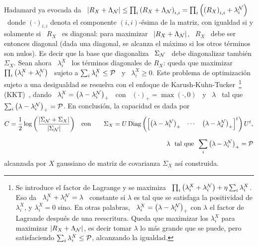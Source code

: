 Hadamard ya evocada da \ $\left| R_X + \Lambda_\N \right| \le \prod_i \left( R_X
  +  \Lambda_\N  \right)_{i,i}  =  \prod_i  \left( \left(  R_X  \right)_{i,i}  +
  \lambda^\N_i   \right)$   \  donde   $(\cdot)_{i,i}$   denota  el   componente
$(i,i)$-\'esima  de la  matriz, con  igualdad si  y solamente  si \  $R_X$  \ es
diagonal: para maximizar \ $\left| R_X + \Lambda_\N \right|$, \ $R_X$ \ debe ser
entonces  diagonal (dada  una  diagonal, se  alcanza  el m\'aximo  si los  otros
t\'erminos son  nulos).  Es decir  que la base  que diagonaliza \  $\Sigma_\N$ \
debe  diagonalizar  tambi\'en $\Sigma_X$.   Sean  ahora  \  $\lambda^X_i$ \  los
t\'erminos  diagonales   de  $R_X$:  queda  que  maximizar   \  $\prod_i  \left(
  \lambda^X_i + \lambda^\N_i \right)$ \ sujeto a $\sum_i \lambda^X_i \le \P$ \ y
\ $\lambda^X_i \ge 0$.  Este problema de optimizaci\'on sujeto a una desigualdad
se  resuelva  con el  enfoque  de  Karush-Kuhn-Tucker~\footnote{Se introduce  el
  factor de Lagrange y se  maximiza \ $\prod_i \left( \lambda^X_i + \lambda^\N_i
  \right) +  \eta \sum_i \lambda^X_i$.  Eso  da \ $\lambda^X_i  + \lambda^\N_i =
  \lambda$ \  constante si $\lambda$ es  tal que se satisfaga  la positividad de
  $\lambda^X_i$, y $\lambda^X_i = 0$  sino.  En otras palabras, \ $\lambda^X_i =
  \left( \lambda -  \lambda^\N_i \right)_+$ con $\lambda$ el  factor de Lagrande
  despu\'es  de una  reescritura.  Queda  que maximizar  los  $\lambda^X_i$ para
  maximizar $\left| R_X + \Lambda_\N \right|$, es decir tomar $\lambda$ lo m\'as
  grande  que se  puede, pero  satisfaciendo  $\sum_i \lambda^X_i  \le \P$,  \ie
  alcanzando  la   igualdad.\label{Foot:SZ:KKT}}  (KKT)~\cite{Mil00,  CamMar09},
dando  \  $\lambda^X_i  = \left(  \lambda  -  \lambda^\N_i  \right)_+$ \  con  \
$(\cdot)_+ = \max(\cdot,0)$ \ y \ $\lambda$ \ tal que \ $\sum_i \left( \lambda -
  \lambda^\N_i \right)_+ = \P$.  En conclusi\'on, la capacidad es dada por
%
\begin{eqnarray*}
C =  \frac12 \log \left(  \frac{\left| \Sigma_\N +  \Sigma_X \right|}{\left|
      \Sigma_\N  \right|}  \right)  & \quad \mbox{con} \quad &  \Sigma_X  =  U
\Diag\left( \begin{bmatrix} \left(\lambda - \lambda^\N_1\right)_+ & \cdots & \left(\lambda -
    \lambda^\N_d \right)_+ \end{bmatrix}^t \right) U^t,\\[2.5mm]
%
& &  \lambda \ \mbox{ tal que } \:
\sum_i \left(\lambda - \lambda^\N_i \right)_+ = \P
\end{eqnarray*}
%
alcanzada por $X$ gaussiano de matriz de covarianza $\Sigma_X$ as\'i construida.


